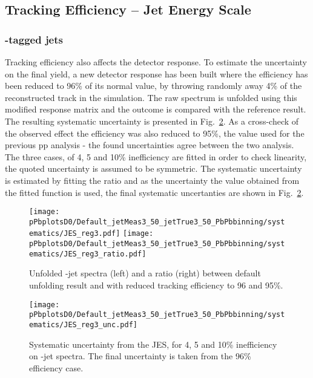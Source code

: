 \subsection{Tracking Efficiency -- Jet Energy Scale}

\subsubsection{\Dzero-tagged jets}

Tracking efficiency also affects the detector response. To estimate the uncertainty on the final yield, a new detector response has been built where the efficiency has been reduced to 96\% of its normal value, by throwing randomly away 4\% of the reconstructed track in the simulation.
The raw spectrum is unfolded using this modified response matrix and the outcome is compared with the reference result. The resulting systematic uncertainty is presented in Fig.~\ref{fig:PbPb_JESsys_Dzero}. As a cross-check of the observed effect the efficiency was also reduced to 95\%, the value used for the previous pp analysis - the found uncertainties agree between the two analysis. 
The three cases, of 4, 5 and 10\% inefficiency are fitted in order to check linearity, the quoted uncertainty is assumed to be symmetric. 
The systematic uncertainty is estimated by fitting the ratio and as the uncertainty the value obtained from the fitted function is used, the final systematic uncertanties are shown in Fig.~\ref{fig:PbPb_JESsys_Dzero}.

\begin{figure}[bth]
\centering
\texttt{[image: pPbplotsD0/Default\_jetMeas3\_50\_jetTrue3\_50\_PbPbbinning/systematics/JES\_reg3.pdf]}
\texttt{[image: pPbplotsD0/Default\_jetMeas3\_50\_jetTrue3\_50\_PbPbbinning/systematics/JES\_reg3\_ratio.pdf]}
\caption{Unfolded \Dzero-jet spectra (left) and a ratio (right) between default unfolding result and with reduced tracking efficiency to 96 and 95\%.}
\label{fig:PbPb_JESsys_Dzero}
\end{figure}


\begin{figure}[bth]
\centering
\texttt{[image: pPbplotsD0/Default\_jetMeas3\_50\_jetTrue3\_50\_PbPbbinning/systematics/JES\_reg3\_unc.pdf]}
\caption{Systematic uncertainty from the JES, for 4, 5 and 10\% inefficiency on \Dzero-jet spectra. The final uncertainty is taken from the 96\% efficiency case. }
\label{fig:PbPb_JESsys_Dzero}
\end{figure}


